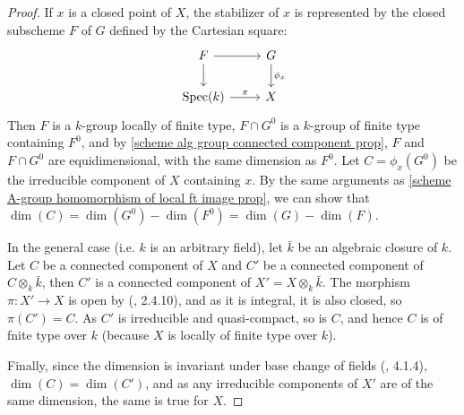 \begin{proof}
If $x$ is a closed point of $X$, the stabilizer of $x$ is represented by the closed subscheme $F$ of $G$ defined by the Cartesian square:
\[\begin{tikzcd}
F\ar[r]\ar[d]&G\ar[d,"\phi_x"]\\
\Spec(k)\ar[r,"x"]&X
\end{tikzcd}\]
Then $F$ is a $k$-group locally of finite type, $F\cap G^0$ is a $k$-group of finite type containing $F^0$, and by \cref{scheme alg group connected component prop}, $F$ and $F\cap G^0$ are equidimensional, with the same dimension as $F^0$. Let $C=\phi_x(G^0)$ be the irreducible component of $X$ containing $x$. By the same arguments as \cref{scheme A-group homomorphism of local ft image prop}, we can show that $\dim(C)=\dim(G^0)-\dim(F^0)=\dim(G)-\dim(F)$.\par
In the general case (i.e. $k$ is an arbitrary field), let $\bar{k}$ be an algebraic closure of $k$. Let $C$ be a connected component of $X$ and $C'$ be a connected component of $C\otimes_k\bar{k}$, then $C'$ is a connected component of $X'=X\otimes_k\bar{k}$. The morphism $\pi:X'\to X$ is open by (\cite{EGA4-2}, 2.4.10), and as it is integral, it is also closed, so $\pi(C')=C$. As $C'$ is irreducible and quasi-compact, so is $C$, and hence $C$ is of fnite type over $k$ (because $X$ is locally of finite type over $k$).\par
Finally, since the dimension is invariant under base change of fields (\cite{EGA4-2}, 4.1.4), $\dim(C)=\dim(C')$, and as any irreducible components of $X'$ are of the same dimension, the same is true for $X$.
\end{proof}

